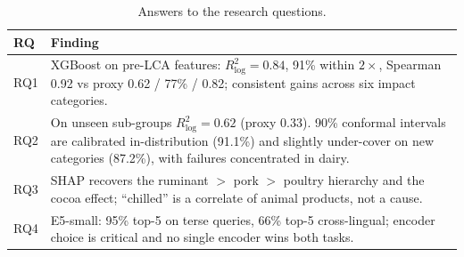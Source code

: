 \begin{table}[ht]
\centering\small
\caption{Answers to the research questions.}
\begin{tabularx}{\textwidth}{@{}lX@{}}
\toprule
RQ & Finding \\
\midrule
RQ1 & XGBoost on pre-LCA features: $R^2_{\log}=0.84$, 91\% within $2\times$, Spearman 0.92 vs proxy 0.62 / 77\% / 0.82; consistent gains across six impact categories. \\
RQ2 & On unseen sub-groups $R^2_{\log}=0.62$ (proxy 0.33). 90\% conformal intervals are calibrated in-distribution (91.1\%) and slightly under-cover on new categories (87.2\%), with failures concentrated in dairy. \\
RQ3 & SHAP recovers the ruminant $>$ pork $>$ poultry hierarchy and the cocoa effect; ``chilled'' is a correlate of animal products, not a cause. \\
RQ4 & E5-small: 95\% top-5 on terse queries, 66\% top-5 cross-lingual; encoder choice is critical and no single encoder wins both tasks. \\
\bottomrule
\end{tabularx}
\end{table}

